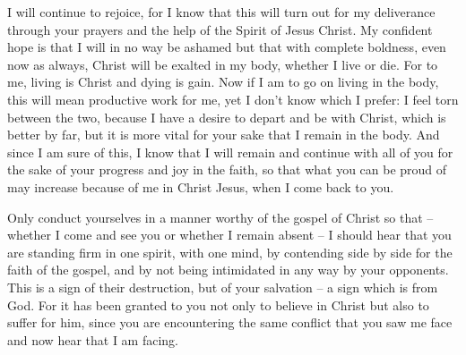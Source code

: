 {I will continue to rejoice,
for
I know
that
this
will turn out
for
my
deliverance
through
your
prayers
and
the help
of the Spirit
of Jesus
Christ.
My
confident
hope
is that
I will
in
no way
be ashamed
but
that with
complete
boldness,
even
now
as
always,
Christ
will be exalted
in
my
body,
whether
I live
or
die.
For
to me,
living
is Christ
and
dying
is gain.
Now
if
I am to go on living
in
the body,
this
will mean productive
work
for me,
yet
I
don’t
know
which
I prefer:
I feel torn
between
the two,
because I have
a desire
to
depart
and
be
with
Christ,
which is better by far,
but
it is more vital
for
your
sake that I remain
in the body.
And
since I am sure
of this,
I know
that
I will remain
and
continue
with all
of you
for the sake
of your
progress
and
joy
in the faith,
so that
what you
can be proud
of may increase
because of
me
in
Christ
Jesus,
when I
come
back
to
you.
\par }{\PP {}Only
conduct
yourselves in a manner
worthy
of the gospel
of Christ
so that
– whether
I come
and
see
you
or whether
I remain absent
– I should hear
that
you are standing firm
in
one
spirit,
with one
mind,
by contending side by side
for the faith
of the gospel,
and
by not
being intimidated
in
any way
by
your opponents.
This is
a sign
of their
destruction,
but
of your
salvation
– a sign
which is from
God.
For
it has been granted
to you
not
only
to
believe
in
Christ
but
also
to suffer
for
him,
since you are encountering
the same
conflict
that you saw
me
face and
now
hear that I am facing.

}
